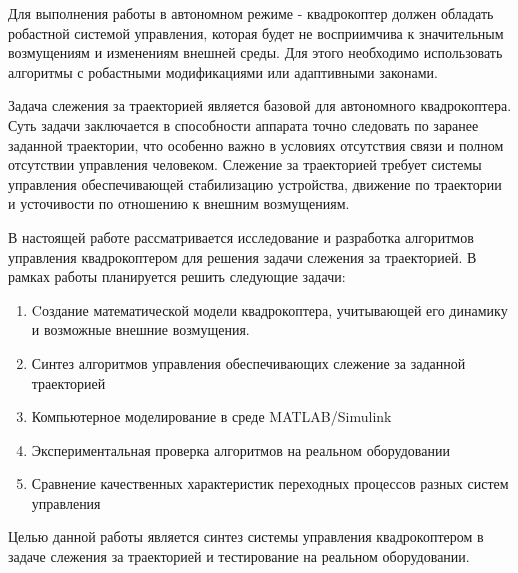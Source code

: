 Для выполнения работы в автономном режиме - квадрокоптер должен обладать 
робастной системой управления, которая будет не восприимчива к значительным 
возмущениям и изменениям внешней среды. Для этого необходимо 
использовать алгоритмы с робастными модификациями или адаптивными законами.


Задача слежения за траекторией является базовой для 
автономного квадрокоптера. Суть задачи заключается в  
способности аппарата точно следовать по заранее заданной 
траектории, что особенно важно в условиях отсутствия связи и полном 
отсутствии управления человеком. 
Слежение за траекторией требует системы управления обеспечивающей 
стабилизацию устройства, движение по траектории и усточивости 
по отношению к внешним возмущениям.


В настоящей работе рассматривается исследование и разработка 
алгоритмов управления квадрокоптером для решения задачи слежения 
за траекторией. В рамках работы планируется решить следующие задачи:

\begin{enumerate}
    \item Cоздание математической модели квадрокоптера, учитывающей его динамику и возможные 
    внешние возмущения.
    \item Синтез алгоритмов управления обеспечивающих слежение за заданной траекторией
    \item Компьютерное моделирование в среде MATLAB/Simulink
    \item Экспериментальная проверка алгоритмов на реальном 
    оборудовании
    \item Сравнение качественных характеристик переходных процессов разных систем управления
\end{enumerate}



Целью данной работы является синтез системы управления 
квадрокоптером в задаче слежения за траекторией и тестирование на реальном оборудовании.





\endinput
